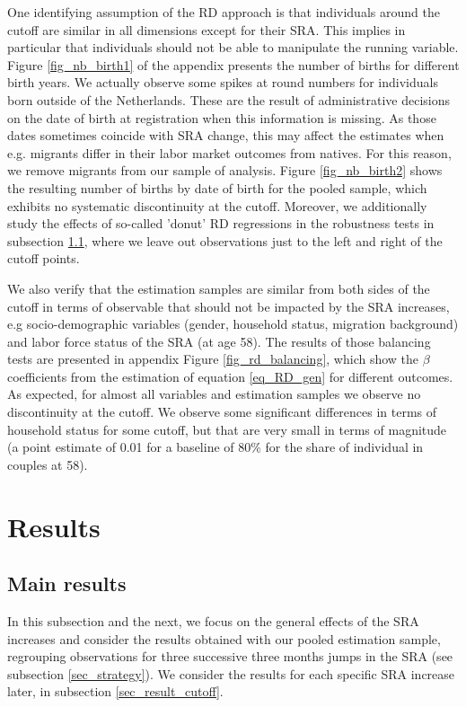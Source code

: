 \documentclass[12pt,a4paper]{article}
\begin{document}
One identifying assumption of the RD approach is that individuals around the cutoff are similar in all dimensions except for their SRA. This implies in particular that individuals should not be able to manipulate the running variable. Figure \ref{fig_nb_birth1} of the appendix presents the number of births for different birth years. We actually observe some spikes at round numbers for individuals born outside of the Netherlands. These are the result of administrative decisions on the date of birth at registration when this information is missing. As those dates sometimes coincide with SRA change, this may affect the estimates when e.g. migrants differ in their labor market outcomes from natives. For this reason, we remove migrants from our sample of analysis. Figure \ref{fig_nb_birth2} shows the resulting number of births by date of birth for the pooled sample, which exhibits no systematic discontinuity at the cutoff. Moreover, we additionally study the effects of so-called 'donut' RD regressions in the robustness tests in subsection \ref{sec_result_main}, where we leave out observations just to the left and right of the cutoff points.

We also verify that the estimation samples are similar from both sides of the cutoff in terms of observable that should not be impacted by the SRA increases, e.g socio-demographic variables (gender, household status, migration background) and labor force status of the SRA (at age 58). The results of those balancing tests are presented in appendix Figure \ref{fig_rd_balancing}, which show the $\beta$ coefficients from the estimation of equation \ref{eq_RD_gen} for different outcomes. As expected, for almost all variables and estimation samples we observe no discontinuity at the cutoff. We observe some significant differences in terms of household status for some cutoff, but that are very small in terms of magnitude (a point estimate of 0.01 for a baseline of 80\% for the share of individual in couples at 58). 

\section{Results}

\subsection{Main results}\label{sec_result_main}

In this subsection and the next, we focus on the general effects of the SRA increases and consider the results obtained with our pooled estimation sample, regrouping observations for three successive three months jumps in the SRA (see subsection \ref{sec_strategy}). We consider the results for each specific SRA increase later, in subsection \ref{sec_result_cutoff}.
\end{document}
